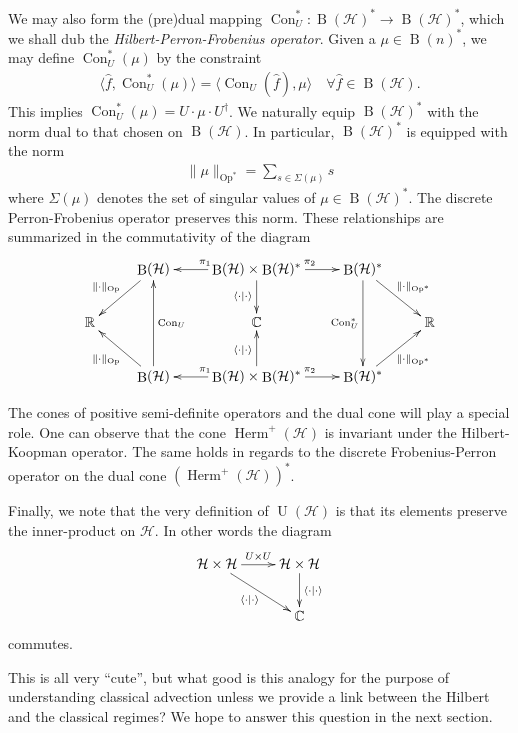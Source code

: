 \documentclass[12pt]{amsart}
\renewcommand{\H}{\ensuremath{\mathcal{H}}}
\DeclareMathOperator{\U}{U}
\DeclareMathOperator{\B}{B}
\DeclareMathOperator{\Herm}{Herm}
\DeclareMathOperator{\Op}{Op}
\DeclareMathOperator{\Con}{Con}
\begin{document}
We may also form the (pre)dual mapping $\Con_U^*: \B(\H)^* \to \B(\H)^*$,
which we shall dub the \emph{Hilbert-Perron-Frobenius operator}.
Given a $\mu \in \B(n)^*$, we may define $\Con_U^*(\mu)$ by the constraint
\begin{align*}
	\langle \hat{f} , \Con_U^*(\mu) \rangle = \langle \Con_U(\hat{f}) , \mu \rangle \quad \forall \hat{f} \in \B(\H).
\end{align*}
This implies $\Con_U^*(\mu) = U \cdot \mu \cdot U^\dagger$.
We naturally equip $\B(\H)^*$ with the norm dual to that chosen on $\B(\H)$.
In particular, $\B(\H)^*$ is  equipped with the norm
\begin{align*}
	\| \mu \|_{\Op^*} = \sum_{s \in \Sigma(\mu) } s
\end{align*}
where $\Sigma(\mu)$ denotes the set of singular values of $\mu \in \B(\H)^*$.
The discrete Perron-Frobenius operator preserves this norm.
These relationships are summarized in the commutativity of the diagram
\begin{equation*}
	\xymatrix{
		& \ar[dl]_{\| \cdot \|_{\Op}} \B(\H) & \ar[l]_{\pi_1} \B(\H)\times \B(\H)^* \ar[d]_{\langle \cdot \mid \cdot \rangle} \ar[r]^{\pi_2} & \B(\H)^*   \ar[dd]_{\Con_U^*} \ar[dr]^{\| \cdot \|_{\Op^*}}& \\
		\mathbb{R} && \mathbb{C} && \mathbb{R} \\
		& \ar[ul]^{\| \cdot \|_{\Op}} \B(\H) \ar[uu]_{\Con_U} & \ar[l]_{\pi_1} \B(\H)\times \B(\H)^* \ar[u]^{\langle \cdot \mid \cdot \rangle} \ar[r]^{\pi_2} & \B(\H)^* \ar[ur]_{\| \cdot \|_{\Op^*}} &	
	}
\end{equation*}

The cones of positive semi-definite operators and the dual cone will play a special role.
One can observe that the cone $\Herm^+(\H)$ is invariant under the Hilbert-Koopman operator.
The same holds in regards to the discrete Frobenius-Perron operator on the dual cone $(\Herm^+(\H))^*$.

Finally, we note that the very definition of $\U(\H)$ is that its elements preserve the inner-product on $\H$.
In other words the diagram
\begin{equation*}
	\xymatrix{
		\H \times \H \ar[dr]_{\langle \cdot \mid \cdot \rangle} \ar[r]^{ U \times U} & \H \times \H \ar[d]^{\langle \cdot \mid \cdot \rangle} \\
		&\mathbb{C}
	}
\end{equation*}
commutes.

This is all very ``cute'', but what good is this analogy for the purpose of understanding
classical advection
unless we provide a link between the Hilbert and the classical regimes?
We hope to answer this question in the next section.
\end{document}
